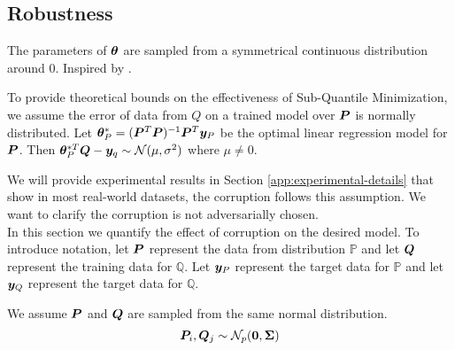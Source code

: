 \documentclass{article} %
\begin{document}
	\subsection{Robustness}
	\begin{assumption}\label{asm:symmetric}
		The parameters of ${\bm{\theta}}$ are sampled from a symmetrical continuous distribution around 0. Inspired by \cite{Lu_2020}. 
	\end{assumption}
	\begin{assumption}\label{asm:normal-corruption}
		To provide theoretical bounds on the effectiveness of Sub-Quantile Minimization, we assume the error of data from $Q$ on a trained model over ${\bm{P}}$ is normally distributed. Let ${\bm{\theta}}_P^* = ({\bm{P}}^T{\bm{P}})^{-1}{\bm{P}}^T {\bm{y}}_P$ be the optimal linear regression model for ${\bm{P}}$. Then ${\bm{\theta}}_P^{*T}{\bm{Q}} - {\bm{y}}_q \sim \mathcal{N}(\mu,\sigma^2)$ where $\mu \neq 0$.
	\end{assumption}
	We will provide experimental results in Section \ref{app:experimental-details} that show in most real-world datasets, the corruption follows this assumption. We want to clarify the corruption is not adversarially chosen. \\
	In this section we quantify the effect of corruption on the desired model. To introduce notation, let ${\bm{P}}$ represent the data from distribution $\mathbb{P}$ and let ${\bm{Q}}$ represent the training data for $\mathbb{Q}$. Let ${\bm{y}}_P$ represent the target data for $\mathbb{P}$ and let ${\bm{y}}_Q$ represent the target data for $\mathbb{Q}$.\\
	\begin{assumption}\label{asm:p-q-sample}
		We assume ${\bm{P}}$ and ${\bm{Q}}$ are sampled from the same normal distribution. \vspace{1em}
		\begin{equation}
			{\bm{P}}_i,{\bm{Q}}_j \sim \mathcal{N}_p(\mathbf{0},{\bm{\Sigma}})
		\end{equation}
	\end{assumption}
	
\end{document}
